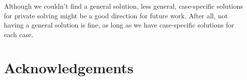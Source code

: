 \documentclass[
    9pt,            %
    report,        %
    affiltop,       %
]{art}
\begin{document}
Although we couldn't find a general solution, less general, case-specific solutions for private solving might be a good direction for future work. After all, not having a general solution is fine, as long as we have case-specific solutions for each case.

\section*{Acknowledgements}


\nocite{*}

\end{document}
